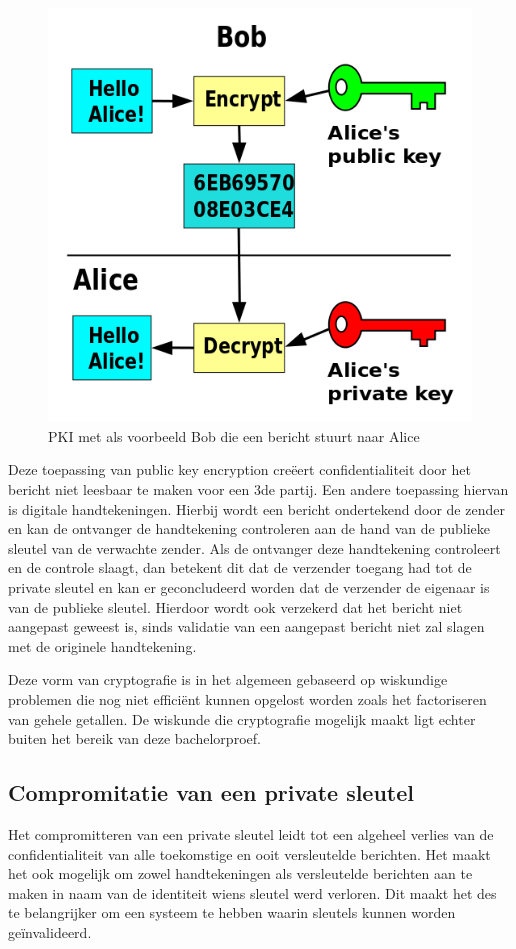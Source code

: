 \begin{figure}[H]
	\includegraphics{img/pki-alice-and-bob}
	\centering
	\caption{\gls{PKI} met als voorbeeld Bob die een bericht stuurt naar Alice}
	\label{fig:pki-alice-and-bob}
\end{figure}

Deze toepassing van public key encryption creëert confidentialiteit door het
bericht niet leesbaar te maken voor een 3de partij. Een andere toepassing
hiervan is digitale handtekeningen. Hierbij wordt een bericht ondertekend door
de zender en kan de ontvanger de handtekening controleren aan de hand van de
publieke sleutel van de verwachte zender. Als de ontvanger deze handtekening
controleert en de controle slaagt, dan betekent dit dat de verzender toegang had
tot de private sleutel en kan er geconcludeerd worden dat de verzender de
eigenaar is van de publieke sleutel. Hierdoor wordt ook verzekerd dat het
bericht niet aangepast geweest is, sinds validatie van een aangepast bericht
niet zal slagen met de originele handtekening.

Deze vorm van cryptografie is in het algemeen gebaseerd op wiskundige problemen
die nog niet efficiënt kunnen opgelost worden zoals het factoriseren van gehele
getallen. De wiskunde die cryptografie mogelijk maakt ligt echter buiten het
bereik van deze bachelorproef.

\subsection{Compromitatie van een private sleutel}
\label{subsec:comprimitatie-van-een-private-sleutel}
Het compromitteren van een private sleutel leidt tot een algeheel verlies van de
confidentialiteit van alle toekomstige en ooit versleutelde berichten. Het maakt
het ook mogelijk om zowel handtekeningen als versleutelde berichten aan te maken
in naam van de identiteit wiens sleutel werd verloren. Dit maakt het des te
belangrijker om een systeem te hebben waarin sleutels kunnen worden
geïnvalideerd.

